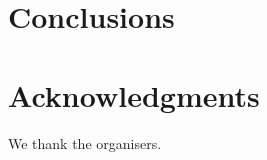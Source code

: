 \section{Conclusions}
\label{sec:psunc:conclusions}




\section*{Acknowledgments}

We thank the organisers.

